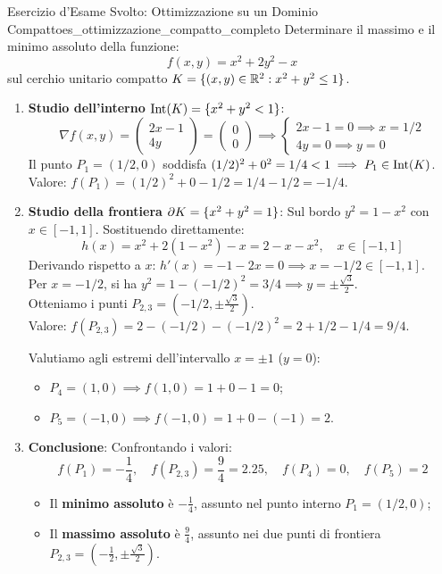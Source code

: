 \begin{esempio}{Esercizio d'Esame Svolto: Ottimizzazione su un Dominio Compatto}{es_ottimizzazione_compatto_completo}
Determinare il massimo e il minimo assoluto della funzione:
\[
f(x, y) = x^2 + 2y^2 - x
\]
sul cerchio unitario compatto $K = \{(x,y) \in \mathbb{R}^2 : x^2 + y^2 \le 1\}$.
\begin{enumerate}
    \item \textbf{Studio dell'interno $\operatorname{Int}(K) = \{x^2+y^2 < 1\}$}:
    \[
    \nabla f(x, y) = \begin{pmatrix} 2x - 1 \\ 4y \end{pmatrix} = \begin{pmatrix} 0 \\ 0 \end{pmatrix} \implies \begin{cases} 2x - 1 = 0 \implies x = 1/2 \\ 4y = 0 \implies y = 0 \end{cases}
    \]
    Il punto $P_1 = (1/2, 0)$ soddisfa $(1/2)^2 + 0^2 = 1/4 < 1 \implies P_1 \in \operatorname{Int}(K)$.\\
    Valore: $f(P_1) = (1/2)^2 + 0 - 1/2 = 1/4 - 1/2 = -1/4$.
    
    \item \textbf{Studio della frontiera $\partial K = \{x^2+y^2 = 1\}$}:
    Sul bordo $y^2 = 1 - x^2$ con $x \in [-1, 1]$. Sostituendo direttamente:
    \[
    h(x) = x^2 + 2(1 - x^2) - x = 2 - x - x^2, \quad x \in [-1, 1]
    \]
    Derivando rispetto a $x$: $h'(x) = -1 - 2x = 0 \implies x = -1/2 \in [-1, 1]$.\\
    Per $x = -1/2$, si ha $y^2 = 1 - (-1/2)^2 = 3/4 \implies y = \pm \frac{\sqrt{3}}{2}$.\\
    Otteniamo i punti $P_{2,3} = \left(-1/2, \pm \frac{\sqrt{3}}{2}\right)$.\\
    Valore: $f(P_{2,3}) = 2 - (-1/2) - (-1/2)^2 = 2 + 1/2 - 1/4 = 9/4$.
    
    Valutiamo agli estremi dell'intervallo $x = \pm 1$ ($y = 0$):
    \begin{itemize}
        \item $P_4 = (1, 0) \implies f(1, 0) = 1 + 0 - 1 = 0$;
        \item $P_5 = (-1, 0) \implies f(-1, 0) = 1 + 0 - (-1) = 2$.
    \end{itemize}
    
    \item \textbf{Conclusione}:
    Confrontando i valori:
    \[
    f(P_1) = -\frac{1}{4}, \quad f(P_{2,3}) = \frac{9}{4} = 2.25, \quad f(P_4) = 0, \quad f(P_5) = 2
    \]
    \begin{itemize}
        \item Il \textbf{minimo assoluto} è $-\frac{1}{4}$, assunto nel punto interno $P_1 = (1/2, 0)$;
        \item Il \textbf{massimo assoluto} è $\frac{9}{4}$, assunto nei due punti di frontiera $P_{2,3} = \left(-\frac{1}{2}, \pm \frac{\sqrt{3}}{2}\right)$.
    \end{itemize}
\end{enumerate}
\end{esempio}
